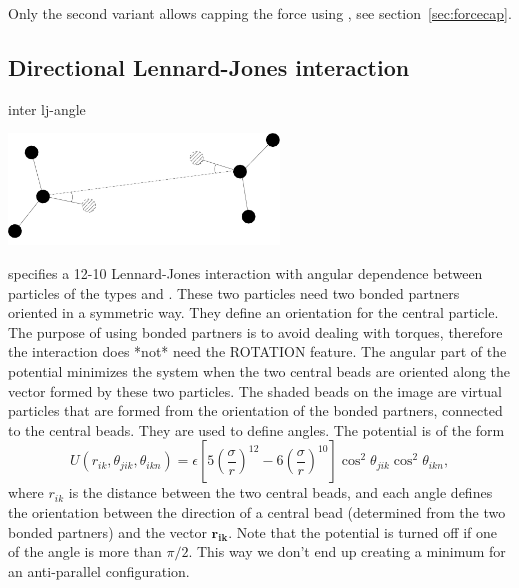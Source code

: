 Only the second variant allows capping the force using , see section~\ref{sec:forcecap}.

\subsection{Directional Lennard-Jones interaction}
\begin{essyntax}
  inter   lj-angle
  \var{\epsilon} \var{\sigma}
    
   
  \begin{features}
  \end{features}
\end{essyntax}

\begin{center}
  \includegraphics[height=8em]{figures/hbond}
\end{center}

specifies a 12-10 Lennard-Jones interaction with angular dependence
between particles of the types  and
. These two particles need two bonded partners oriented in a symmetric way. They define an orientation for the central particle. The purpose of using bonded partners is to avoid dealing with torques, therefore the interaction does *not* need the ROTATION feature. The angular part of the potential minimizes the system when the two central beads are oriented along the vector formed by these two particles. The shaded beads on the image are virtual particles that are formed from the orientation of the bonded partners, connected to the central beads. They are used to define angles. The potential is of the form
\begin{equation}
  U(r_{ik},\theta_{jik},\theta_{ikn})=\epsilon\left[5\left(\frac{\sigma}r\right)^{12}-6\left(\frac{\sigma}{r}\right)^{10}\right]\cos^2\theta_{jik}\cos^2\theta_{ikn},
\end{equation}
where $r_{ik}$ is the distance between the two central beads, and each angle defines the orientation between the direction of a central bead (determined from the two bonded partners) and the vector $\mathbf{r_{ik}}$. Note that the potential is turned off if one of the angle is more than $\pi/2$. This way we don't end up creating a minimum for an anti-parallel configuration.

